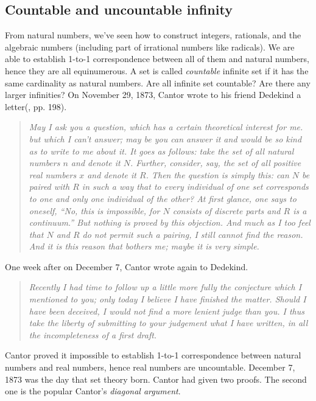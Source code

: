\documentclass{article}
\begin{document}
\lstset{frame=none}

\subsection{Countable and uncountable infinity}
From natural numbers, we've seen how to construct integers, rationals, and the algebraic numbers (including part of irrational numbers like radicals). We are able to establish 1-to-1 correspondence between all of them and natural numbers, hence they are all equinumerous. A set is called {\em countable} infinite set if it has the same cardinality as natural numbers. Are all infinite set countable? Are there any larger infinities? On November 29, 1873, Cantor wrote to his friend Dedekind a letter(\cite{Calvin-Clawson-1994}, pp. 198).

\begin{quotation}
\itshape
May I ask you a question, which has a certain theoretical interest for me. but which I can't answer; may be you can answer it and would be so kind as to write to me about it. It goes as follows: take the set of all natural numbers $n$ and denote it $N$. Further, consider, say, the set of all positive real numbers $x$ and denote it $R$. Then the question is simply this: can $N$ be paired with $R$ in such a way that to every individual of one set corresponds to one and only one individual of the other? At first glance, one says to oneself, ``No, this is impossible, for $N$ consists of discrete parts and $R$ is a continuum.'' But nothing is proved by this objection. And much as I too feel that $N$ and $R$ do not permit such a pairing, I still cannot find the reason. And it is this reason that bothers me; maybe it is very simple.
\end{quotation}


One week after on December 7, Cantor wrote again to Dedekind.

\begin{quotation}
\itshape
Recently I had time to follow up a little more fully the conjecture which I mentioned to you; only today I believe I have finished the matter. Should I have been deceived, I would not find a more lenient judge than you. I thus take the liberty of submitting to your judgement what I have written, in all the incompleteness of a first draft.
\end{quotation}

Cantor proved it impossible to establish 1-to-1 correspondence between natural numbers and real numbers, hence real numbers are uncountable. December 7, 1873 was the day that set theory born. Cantor had given two proofs. The second one is the popular Cantor's {\em diagonal argument}.
\end{document}
